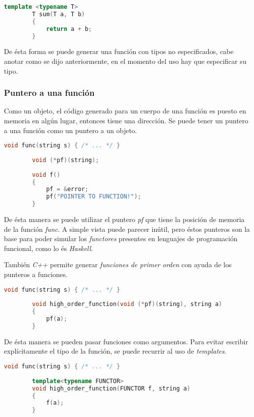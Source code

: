 		\begin{lstlisting}[language=C++, caption=Función que suma dos variables de tipo T]
		template <typename T>
		T sum(T a, T b)
		{
			return a + b;
		}
		\end{lstlisting}
		
		De ésta forma se puede generar una función con tipos no especificados, cabe anotar como se dijo anteriormente, en el momento del uso hay que especificar su tipo.
	
	\subsubsection{Puntero a una función}
		Como un objeto, el código generado para un cuerpo de una función es puesto en memoria en algún lugar, entonces tiene una dirección. Se puede tener un puntero a una función como un puntero a un objeto. \cite{Bjarne}
		
		\begin{lstlisting}[language=C++, caption=Puntero a una función]
		void func(string s) { /* ... */ }
		
		void (*pf)(string);
		
		void f()
		{
			pf = &error;
			pf("POINTER TO FUNCTION!");
		}
		\end{lstlisting}
		
		De ésta manera se puede utilizar el puntero \emph{pf} que tiene la posición de memoria de la función \emph{func}. A simple vista puede parecer inútil, pero éstos punteros son la base para poder simular los \emph{functores} presentes en lenguajes de programación funcional, como lo és \emph{Haskell}.
		
		También \emph{C++} permite generar \emph{funciones de primer orden} con ayuda de los punteros a funciones.
		
		\begin{lstlisting}[language=C++, caption=Funciones de primer orden]
		void func(string s) { /* ... */ }
		
		void high_order_function(void (*pf)(string), string a)
		{
			pf(a);
		}
		\end{lstlisting}
		
		De ésta manera se pueden pasar funciones como argumentos. Para evitar escribir explícitamente el tipo de la función, se puede recurrir al uso de \emph{templates}.
		
		\begin{lstlisting}[language=C++, caption=Funciones de primer orden con templates]
		void func(string s) { /* ... */ }
		
		template<typename FUNCTOR>
		void high_order_function(FUNCTOR f, string a)
		{ 
			f(a);
		}
		\end{lstlisting}
		
